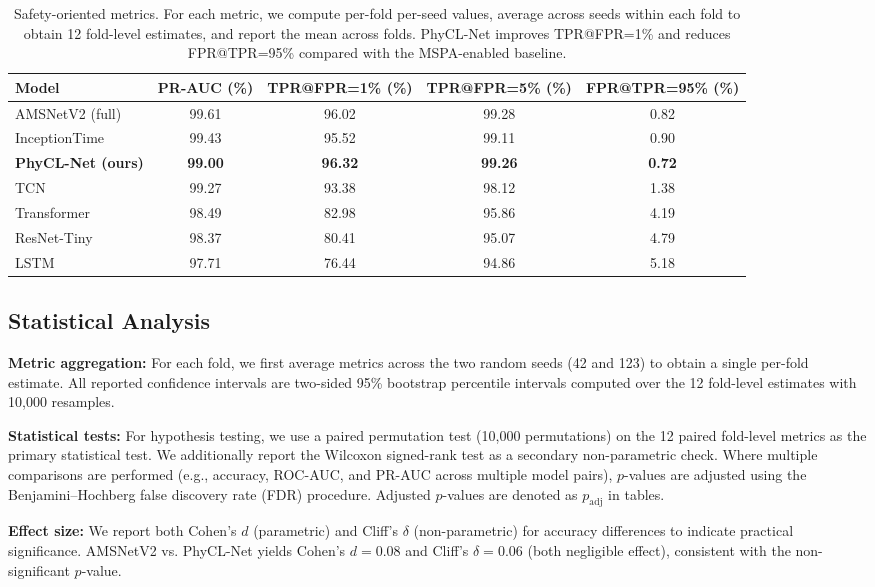 \documentclass{article}
\begin{document}
\begin{table}[htbp]
\caption{Safety-oriented metrics. For each metric, we compute per-fold per-seed values, average across seeds within each fold to obtain 12 fold-level estimates, and report the mean across folds. PhyCL-Net improves TPR@FPR=1\% and reduces FPR@TPR=95\% compared with the MSPA-enabled baseline.}
\label{tab:safety}
\centering
\small
\begin{tabular}{lcccc}
\toprule
Model & PR-AUC (\%) & TPR@FPR=1\% (\%) & TPR@FPR=5\% (\%) & FPR@TPR=95\% (\%) \\
\midrule
AMSNetV2 (full) & 99.61 & 96.02 & 99.28 & 0.82 \\
InceptionTime & 99.43 & 95.52 & 99.11 & 0.90 \\
\textbf{PhyCL-Net (ours)} & \textbf{99.00} & \textbf{96.32} & \textbf{99.26} & \textbf{0.72} \\
TCN & 99.27 & 93.38 & 98.12 & 1.38 \\
Transformer & 98.49 & 82.98 & 95.86 & 4.19 \\
ResNet-Tiny & 98.37 & 80.41 & 95.07 & 4.79 \\
LSTM & 97.71 & 76.44 & 94.86 & 5.18 \\
\bottomrule
\end{tabular}
\end{table}

\subsection{Statistical Analysis}

\textbf{Metric aggregation:} For each fold, we first average metrics across the two random seeds (42 and 123) to obtain a single per-fold estimate. All reported confidence intervals are two-sided 95\% bootstrap percentile intervals computed over the 12 fold-level estimates with 10,000 resamples.

\textbf{Statistical tests:} For hypothesis testing, we use a paired permutation test (10,000 permutations) on the 12 paired fold-level metrics as the primary statistical test. We additionally report the Wilcoxon signed-rank test as a secondary non-parametric check. Where multiple comparisons are performed (e.g., accuracy, ROC-AUC, and PR-AUC across multiple model pairs), $p$-values are adjusted using the Benjamini--Hochberg false discovery rate (FDR) procedure. Adjusted $p$-values are denoted as $p_{\mathrm{adj}}$ in tables.

\textbf{Effect size:} We report both Cohen's $d$ (parametric) and Cliff's $\delta$ (non-parametric) for accuracy differences to indicate practical significance. AMSNetV2 vs. PhyCL-Net yields Cohen's $d = 0.08$ and Cliff's $\delta = 0.06$ (both negligible effect), consistent with the non-significant $p$-value.
\end{document}
